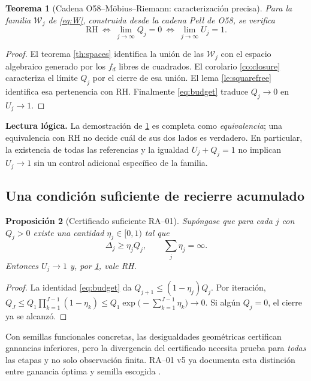 \documentclass[11pt,a4paper]{article}
\theoremstyle{mine}
\newtheorem{teorema}{Teorema}[section]
\newtheorem{proposicion}[teorema]{Proposición}
\theoremstyle{definition}
\newcommand{\WW}{\mathcal W}
\newcommand{\RH}{\mathrm{RH}}
\begin{document}
\begin{teorema}[Cadena O58--Möbius--Riemann: caracterización precisa]\label{th:main}
Para la familia $\WW_j$ de \eqref{eq:W}, construida desde la cadena Pell de O58, se verifica
\begin{equation}\label{eq:main}
\boxed{\qquad \RH\ \Longleftrightarrow\ \lim_{j\to\infty}Q_j=0
\ \Longleftrightarrow\ \lim_{j\to\infty}U_j=1.\qquad}
\end{equation}
\end{teorema}
\begin{proof}
El teorema \ref{th:spaces} identifica la unión de las $\WW_j$ con el espacio algebraico generado por los $f_d$ libres de cuadrados. El corolario \ref{co:closure} caracteriza el límite $Q_j$ por el cierre de esa unión. El lema \ref{le:squarefree} identifica esa pertenencia con RH. Finalmente \eqref{eq:budget} traduce $Q_j\to0$ en $U_j\to1$.
\end{proof}

\textbf{Lectura lógica.} La demostración de \cref{th:main} es completa como \emph{equivalencia}; una equivalencia con RH no decide cuál de sus dos lados es verdadero. En particular, la existencia de todas las referencias y la igualdad $U_j+Q_j=1$ no implican $U_j\to1$ sin un control adicional específico de la familia.

\subsection{Una condición suficiente de recierre acumulado}

\begin{proposicion}[Certificado suficiente RA--01]\label{pr:RA}
Supóngase que para cada $j$ con $Q_j>0$ existe una cantidad $\eta_j\in[0,1)$ tal que
\begin{equation}\label{eq:contract}
\Delta_j\ge\eta_j Q_j,\qquad\sum_j\eta_j=\infty.
\end{equation}
Entonces $U_j\to1$ y, por \cref{th:main}, vale RH.
\end{proposicion}
\begin{proof}
La identidad \eqref{eq:budget} da $Q_{j+1}\le (1-\eta_j)Q_j$. Por iteración,
$Q_J\le Q_1\prod_{k=1}^{J-1}(1-\eta_k)\le Q_1\exp\bigl(-\sum_{k=1}^{J-1}\eta_k\bigr)\to0$. Si algún $Q_j=0$, el cierre ya se alcanzó.
\end{proof}

Con semillas funcionales concretas, las desigualdades geométricas certifican ganancias inferiores, pero la divergencia del certificado necesita prueba para \emph{todas} las etapas y no solo observación finita. RA--01 v5 ya documenta esta distinción entre ganancia óptima y semilla escogida \cite{RA01Audit}.
\end{document}
